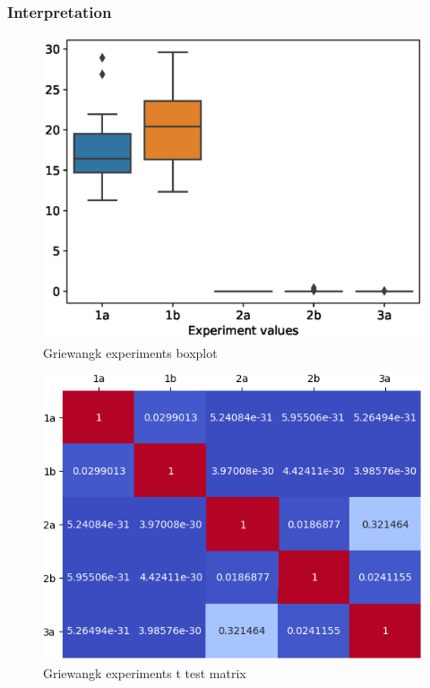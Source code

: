 \documentclass{article}
\begin{document}
\subsubsection{Interpretation}
\begin{figure}[!htbp]
	\centering
	\begin{minipage}{\textwidth}
		\centering
		\includegraphics[scale=.8]{boxplots/griewangk_boxplot.eps}
		\caption{Griewangk experiments boxplot}
		\label{fig:griewangk_experiments_boxplot}
	\end{minipage}\hfill
\end{figure}
\FloatBarrier

\begin{figure}[!htbp]
	\centering
	\begin{minipage}{\textwidth}
		\centering
		\includegraphics[scale=.8]{t_test/griewangk_t_test_matrix.png}
		\caption{Griewangk experiments t test matrix}
		\label{fig:griewangk_experiments_t_test}
	\end{minipage}\hfill
\end{figure}
\FloatBarrier
\end{document}
